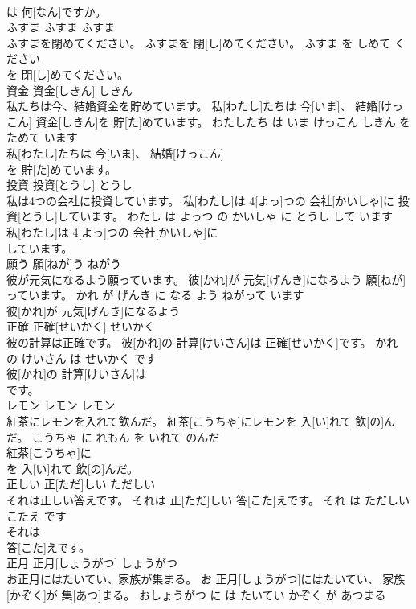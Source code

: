 \documentclass[8pt]{extreport}
\begin{document}
\begin{CJK}{UTF8}{min}
\\	は 何[なん]ですか。			
\\	ふすま	ふすま	ふすま	
\\	ふすまを閉めてください。	ふすまを 閉[し]めてください。	ふすま を しめて ください	
\\	を 閉[し]めてください。			
\\	資金	資金[しきん]	しきん	
\\	私たちは今、結婚資金を貯めています。	私[わたし]たちは 今[いま]、 結婚[けっこん] 資金[しきん]を 貯[た]めています。	わたしたち は いま けっこん しきん を ためて います	
\\	私[わたし]たちは 今[いま]、 結婚[けっこん]
\\	を 貯[た]めています。			
\\	投資	投資[とうし]	とうし	
\\	私は4つの会社に投資しています。	私[わたし]は 4[よっ]つの 会社[かいしゃ]に 投資[とうし]しています。	わたし は よっつ の かいしゃ に とうし して います	
\\	私[わたし]は 4[よっ]つの 会社[かいしゃ]に
\\	しています。			
\\	願う	願[ねが]う	ねがう	
\\	彼が元気になるよう願っています。	彼[かれ]が 元気[げんき]になるよう 願[ねが]っています。	かれ が げんき に なる よう ねがって います	
\\	彼[かれ]が 元気[げんき]になるよう
\\	正確	正確[せいかく]	せいかく	
\\	彼の計算は正確です。	彼[かれ]の 計算[けいさん]は 正確[せいかく]です。	かれ の けいさん は せいかく です	
\\	彼[かれ]の 計算[けいさん]は
\\	です。			
\\	レモン	レモン	レモン	
\\	紅茶にレモンを入れて飲んだ。	紅茶[こうちゃ]にレモンを 入[い]れて 飲[の]んだ。	こうちゃ に れもん を いれて のんだ	
\\	紅茶[こうちゃ]に
\\	を 入[い]れて 飲[の]んだ。			
\\	正しい	正[ただ]しい	ただしい	
\\	それは正しい答えです。	それは 正[ただ]しい 答[こた]えです。	それ は ただしい こたえ です	
\\	それは
\\	答[こた]えです。			
\\	正月	正月[しょうがつ]	しょうがつ	
\\	お正月にはたいてい、家族が集まる。	お 正月[しょうがつ]にはたいてい、 家族[かぞく]が 集[あつ]まる。	おしょうがつ に は たいてい かぞく が あつまる	

\end{CJK}
\end{document}
